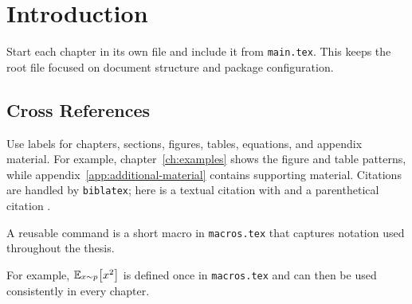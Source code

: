 
\chapter{Introduction}
\label{ch:introduction}

Start each chapter in its own file and include it from \texttt{main.tex}. This
keeps the root file focused on document structure and package configuration.

\section{Cross References}
\label{sec:cross-references}

Use labels for chapters, sections, figures, tables, equations, and appendix
material. For example, chapter~\ref{ch:examples} shows the figure and table
patterns, while appendix~\ref{app:additional-material} contains supporting
material. Citations are handled by \texttt{biblatex}; here is a textual citation
with \textcite{knuth1984texbook} and a parenthetical citation \cite{lamport1994latex}.

\begin{definition}
A reusable command is a short macro in \texttt{macros.tex} that captures
notation used throughout the thesis.
\end{definition}

For example, \(\E[x \sim p]{x^2}\) is defined once in \texttt{macros.tex} and
can then be used consistently in every chapter.
